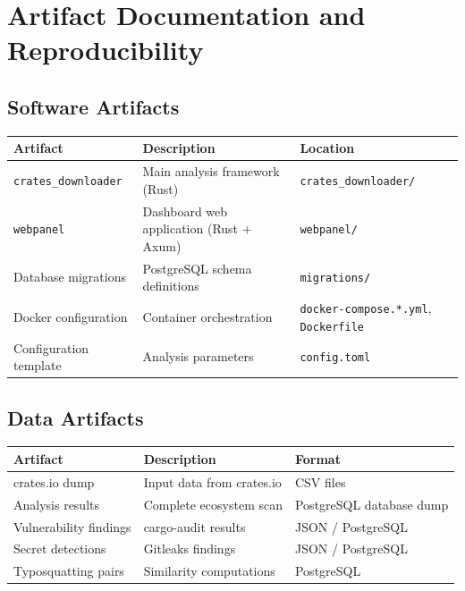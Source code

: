 \chapter{Artifact Documentation and Reproducibility}\label{appendix:artifacts}

\section{Software Artifacts}\label{sect:software-artifacts}

\begin{table}[h]
\centering
\begin{tabularx}{\textwidth}{|l|X|X|}
\hline
\textbf{Artifact} & \textbf{Description} & \textbf{Location} \\
\hline
\texttt{crates\_downloader} & Main analysis framework (Rust) & \texttt{crates\_downloader/} \\
\hline
\texttt{webpanel} & Dashboard web application (Rust + Axum) & \texttt{webpanel/} \\
\hline
Database migrations & PostgreSQL schema definitions & \texttt{migrations/} \\
\hline
Docker configuration & Container orchestration & \texttt{docker-compose.*.yml}, \texttt{Dockerfile} \\
\hline
Configuration template & Analysis parameters & \texttt{config.toml} \\
\hline
\end{tabularx}
\end{table}

\section{Data Artifacts}\label{sect:data-artifacts}

\begin{table}[h]
\centering
\begin{tabular}{|l|l|l|}
\hline
\textbf{Artifact} & \textbf{Description} & \textbf{Format} \\
\hline
crates.io dump & Input data from crates.io & CSV files \\
\hline
Analysis results & Complete ecosystem scan & PostgreSQL database dump \\
\hline
Vulnerability findings & cargo-audit results & JSON / PostgreSQL \\
\hline
Secret detections & Gitleaks findings & JSON / PostgreSQL \\
\hline
Typosquatting pairs & Similarity computations & PostgreSQL \\
\hline
\end{tabular}
\end{table}

